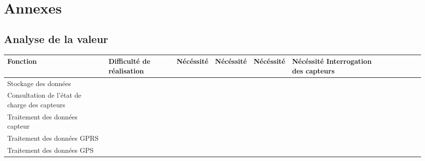 \vfil
\pagebreak
\section{Annexes}

\subsection{Analyse de la valeur}

\begin{center}
\begin{longtable}{|m{6cm}|m{17mm}|m{17mm}|m{17mm}|m{17mm}|m{17mm}|}
\hline
Fonction & Difficulté de réalisation & Nécéssité & Nécéssité & Nécéssité & Nécéssité\endhead
\hline
Interrogation des capteurs
& %

& %

& %

& %

& %

\\\hline
Stockage des données
& %

& %

& %

& %

& %

\\\hline
Consultation de l'état de charge des capteurs
& %

& %

& %

& %

& %

\\\hline
Traitement des données capteur
& %

& %

& %

& %

& %

\\\hline
Traitement des données GPRS
& %

& %

& %

& %

& %

\\\hline
Traitement des données GPS
& %


\end{longtable}
\end{center}
